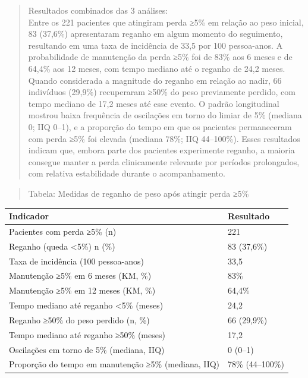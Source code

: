 \documentclass[
]{article}
\begin{document}
\begin{quote}
Resultados combinados das 3 análises:\\
Entre os 221 pacientes que atingiram perda ≥5\% em relação ao peso
inicial, 83 (37,6\%) apresentaram reganho em algum momento do
seguimento, resultando em uma taxa de incidência de 33,5 por 100
pessoa-anos. A probabilidade de manutenção da perda ≥5\% foi de 83\% aos
6 meses e de 64,4\% aos 12 meses, com tempo mediano até o reganho de
24,2 meses. Quando considerada a magnitude do reganho em relação ao
nadir, 66 indivíduos (29,9\%) recuperaram ≥50\% do peso previamente
perdido, com tempo mediano de 17,2 meses até esse evento. O padrão
longitudinal mostrou baixa frequência de oscilações em torno do limiar
de 5\% (mediana 0; IIQ 0--1), e a proporção do tempo em que os pacientes
permaneceram com perda ≥5\% foi elevada (mediana 78\%; IIQ 44--100\%).
Esses resultados indicam que, embora parte dos pacientes experimente
reganho, a maioria consegue manter a perda clinicamente relevante por
períodos prolongados, com relativa estabilidade durante o
acompanhamento.\\
\end{quote}

\begin{quote}
Tabela: Medidas de reganho de peso após atingir perda ≥5\%
\end{quote}

\begin{longtable}[]{@{}ll@{}}
\toprule\noalign{}
Indicador & Resultado \\
\midrule\noalign{}
\endhead
\bottomrule\noalign{}
\endlastfoot
Pacientes com perda ≥5\% (n) & 221 \\
Reganho (queda \textless5\%) n (\%) & 83 (37,6\%) \\
Taxa de incidência (100 pessoa-anos) & 33,5 \\
Manutenção ≥5\% em 6 meses (KM, \%) & 83\% \\
Manutenção ≥5\% em 12 meses (KM, \%) & 64,4\% \\
Tempo mediano até reganho \textless5\% (meses) & 24,2 \\
Reganho ≥50\% do peso perdido (n, \%) & 66 (29,9\%) \\
Tempo mediano até reganho ≥50\% (meses) & 17,2 \\
Oscilações em torno de 5\% (mediana, IIQ) & 0 (0--1) \\
Proporção do tempo em manutenção ≥5\% (mediana, IIQ) & 78\%
(44--100\%) \\
\end{longtable}
\end{document}
